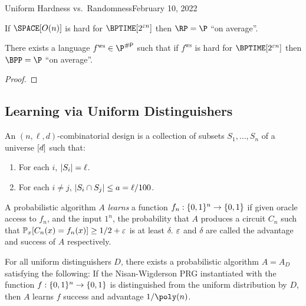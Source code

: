 \begin{lecture}{4}{Uniform Hardness vs.\ Randomness}{February 10, 2022}
\begin{theorem}
	If
	$\SPACE\brac{O(n)}$ is hard for $\BPTIME\brac{2^{\eps n}}$
	then
	$\RP = \P$ ``on average''.
\end{theorem}

\newcommand{\fws}{\ensuremath{ f^{\text{ws}} }}
\begin{theorem}
	There exists a language $\fws \in \P^{\sharpp}$ such that if $\fws$
	is hard for $\BPTIME\brac{2^{\eps n}}$ then
	$\BPP = \P$ ``on average''.
\end{theorem}

\begin{proof}
\end{proof}

\subsection{Learning via Uniform Distinguishers}

\begin{definition}
	An $(n, \ell, d)$-combinatorial design is a collection of subsets
	$S_1, \ldots , S_n$ of a universe $[d]$ such that:
	\begin{enumerate}
		\item For each $i$, $\lvert S_i\rvert = \ell$.
		\item For each $i \neq j$, $\lvert S_i \cap S_j\rvert \leq a = \ell / 100$.
	\end{enumerate}
\end{definition}


\begin{definition}
	A probabilistic algorithm $A$ \emph{learns} a function
	$f_n : \{0, 1\}^n \to \{0, 1\}$ if given oracle access to $f_n$, and
	the input $1^n$, the probability that $A$ produces a circuit $C_n$ such
	that $\mathbb{P}_x [C_n(x) = f_n(x)] \geq 1/2 + \varepsilon$ is at least $\delta$.
	$\varepsilon$ and $\delta$ are called the advantage and success of $A$
	respectively.
\end{definition}

\begin{proposition}
	For all uniform distinguishers $D$, there exists a probabilistic algorithm
	$A = A_D$ satisfying the following: If the Nisan-Wigderson PRG instantiated
	with the function $f: \{0, 1\}^n \to \{0, 1\}$ is distinguished from
	the uniform distribution by $D$, then $A$ learns $f$ success and advantage
	$1 / \poly(n)$.
\end{proposition}


\end{lecture}
